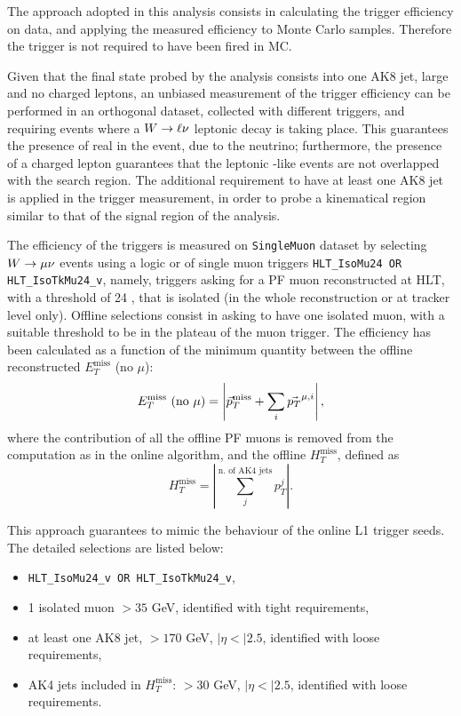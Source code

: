 \noindent The approach adopted in this analysis consists in calculating the trigger efficiency on data, and applying the measured efficiency to Monte Carlo samples. Therefore the trigger is not required to have been fired in MC.

\noindent Given that the final state probed by the analysis consists into one AK8 jet, large \MET and no charged leptons, an unbiased measurement of the \MET trigger efficiency can be performed in an orthogonal dataset, collected with different triggers, and requiring events where a $W \rightarrow \ell \nu$ leptonic decay is taking place. This guarantees the presence of real \met in the event, due to the neutrino; furthermore, the presence of a charged lepton guarantees that the leptonic \W-like events are not overlapped with the search region. The additional requirement to have at least one AK8 jet is applied in the trigger measurement, in order to probe a kinematical region similar to that of the signal region of the analysis.

\noindent The efficiency of the \MET triggers is measured on {\tt SingleMuon} dataset by selecting $W \to \mu \nu$ events using a logic or of single muon triggers {\tt HLT\_IsoMu24 OR HLT\_IsoTkMu24\_v}, namely, triggers asking for a PF muon reconstructed at HLT, with a \pt threshold of 24 \GeV, that is isolated (in the whole reconstruction or at tracker level only). Offline selections consist in asking to have one isolated muon, with a suitable \pt threshold to be in the plateau of the muon trigger. The efficiency has been calculated as a function of the minimum quantity between the offline reconstructed $E_T^{\text{miss}}$ (no $\mu$):
\begin{equation}
E_T^{\text{miss}} \text{ (no } \mu \text{)} = \left| \vec{p}_T^{\text{miss}} + \sum_i \vec{p_T}^{\mu,i} \right|,
\label{eq:met_nomu}
\end{equation}
where the contribution of all the offline PF muons is removed from the \met computation as in the online algorithm, and the offline ${H}_T^{\text{miss}}$, defined as
\begin{equation}
{H}_T^{\text{miss}} = \left| \sum_{j}^{\text{n. of AK4 jets}} p_T^{j} \right|.
\label{eq:mht}
\end{equation}

\noindent This approach guarantees to mimic the behaviour of the online L1 trigger seeds. The detailed selections are listed below:
\begin{itemize}
\item {\tt HLT\_IsoMu24\_v OR HLT\_IsoTkMu24\_v},
\item 1 isolated muon \pt$>35$ GeV, identified with tight requirements,
\item at least one AK8 jet, \pt$>170$ GeV, $|\eta<|2.5$, identified with loose requirements,
\item AK4 jets included in ${H}_T^{\text{miss}}$: \pt$>30$ GeV, $|\eta<|2.5$, identified with loose requirements.
\end{itemize}

